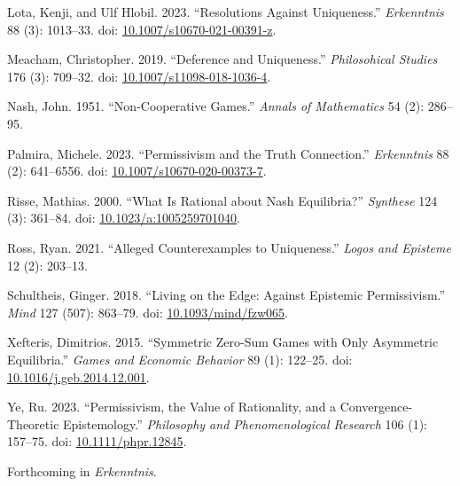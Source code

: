 \documentclass[
  11pt,
  letterpaper,
  DIV=11,
  numbers=noendperiod,
  twoside]{scrartcl}
\newlength{\cslhangindent}
\newenvironment{CSLReferences}[2] %
 {\begin{list}{}{%
  \setlength{\itemindent}{0pt}
  \setlength{\leftmargin}{0pt}
  \setlength{\parsep}{0pt}
  \ifodd #1
   \setlength{\leftmargin}{\cslhangindent}
   \setlength{\itemindent}{-1\cslhangindent}
  \fi
  \setlength{\itemsep}{#2\baselineskip}}}
 {\end{list}}
\begin{document}
\begin{CSLReferences}{1}{0}
Lota, Kenji, and Ulf Hlobil. 2023. {``Resolutions Against Uniqueness.''}
\emph{Erkenntnis} 88 (3): 1013--33. doi:
\href{https://doi.org/10.1007/s10670-021-00391-z}{10.1007/s10670-021-00391-z}.

Meacham, Christopher. 2019. {``Deference and Uniqueness.''}
\emph{Philosohical Studies} 176 (3): 709--32. doi:
\href{https://doi.org/10.1007/s11098-018-1036-4}{10.1007/s11098-018-1036-4}.

Nash, John. 1951. {``Non-Cooperative Games.''} \emph{Annals of
Mathematics} 54 (2): 286--95.

Palmira, Michele. 2023. {``Permissivism and the Truth Connection.''}
\emph{Erkenntnis} 88 (2): 641--6556. doi:
\href{https://doi.org/10.1007/s10670-020-00373-7}{10.1007/s10670-020-00373-7}.

Risse, Mathias. 2000. {``What Is Rational about Nash Equilibria?''}
\emph{Synthese} 124 (3): 361--84. doi:
\href{https://doi.org/10.1023/a:1005259701040}{10.1023/a:1005259701040}.

Ross, Ryan. 2021. {``Alleged Counterexamples to Uniqueness.''}
\emph{Logos and Episteme} 12 (2): 203--13.

Schultheis, Ginger. 2018. {``Living on the Edge: Against Epistemic
Permissivism.''} \emph{Mind} 127 (507): 863--79. doi:
\href{https://doi.org/10.1093/mind/fzw065}{10.1093/mind/fzw065}.

Xefteris, Dimitrios. 2015. {``Symmetric Zero-Sum Games with Only
Asymmetric Equilibria.''} \emph{Games and Economic Behavior} 89 (1):
122--25. doi:
\href{https://doi.org/10.1016/j.geb.2014.12.001}{10.1016/j.geb.2014.12.001}.

Ye, Ru. 2023. {``Permissivism, the Value of Rationality, and a
Convergence-Theoretic Epistemology.''} \emph{Philosophy and
Phenomenological Research} 106 (1): 157--75. doi:
\href{https://doi.org/10.1111/phpr.12845}{10.1111/phpr.12845}.

\end{CSLReferences}



Forthcoming in \emph{Erkenntnis}.
\end{document}
